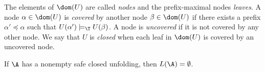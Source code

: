 The elements of $\dom(U)$ are called \emph{nodes} and the
prefix-maximal nodes \emph{leaves}. A node $\alpha \in \dom(U)$ is
\emph{covered} by another node $\beta \in \dom(U)$ if there exists a
prefix $\alpha' \preceq \alpha$ such that $U(\alpha') \models_\T
U(\beta)$. A node is \emph{uncovered} if it is not covered by any
other node. We say that $U$ is \emph{closed} when each leaf in
$\dom(U)$ is covered by an uncovered node.

\begin{lemma}\label{lemma:art}
  If $\A$ has a nonempty safe closed unfolding, then $L(\A) =
  \emptyset$.
\end{lemma}
